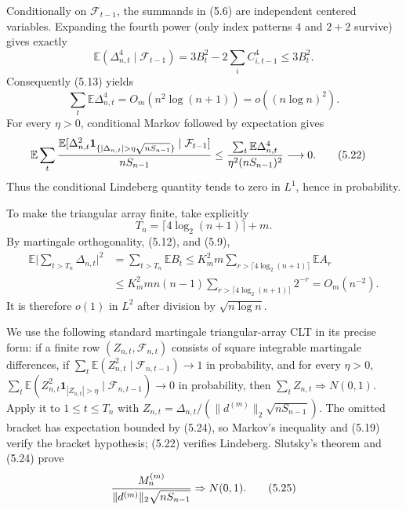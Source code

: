 \documentclass[11pt]{article}
\numberwithin{equation}{section}
\newcommand{\E}{\mathbb E}\newcommand{\Pp}{\mathbb P}
\newcommand{\1}{\mathbf 1}\newcommand{\F}{\mathcal F}\newcommand{\D}{\mathcal D}
\begin{document}
Conditionally on $\mathcal F_{t-1}$, the summands in (5.6) are independent
centered variables.  Expanding the fourth power (only index patterns $4$ and
$2+2$ survive) gives exactly
\begin{equation}
 \E(\Delta_{n,t}^4\mid\mathcal F_{t-1})
 =3B_t^2-2\sum_iC_{i,t-1}^4\le3B_t^2.                        \tag{5.20}
\end{equation}
Consequently (5.13) yields
\begin{equation}
 \sum_t\E\Delta_{n,t}^4=O_m(n^2\log(n+1))
                         =o((n\log n)^2).                    \tag{5.21}
\end{equation}
For every $\eta>0$, conditional Markov followed by expectation gives
\begin{align}
 \E\sum_t {\E[\Delta_{n,t}^2{\mathbf 1}_{\{|\Delta_{n,t}|>
 \eta\sqrt{nS_{n-1}}\}}\mid\mathcal F_{t-1}]\over nS_{n-1}}
 &\le {\sum_t\E\Delta_{n,t}^4\over
             \eta^2(nS_{n-1})^2}\longrightarrow0.           \tag{5.22}
\end{align}
Thus the conditional Lindeberg quantity tends to zero in $L^1$, hence in
probability.

To make the triangular array finite, take explicitly
\begin{equation}T_n=\lceil4\log_2(n+1)\rceil+m.               \tag{5.23}
\end{equation}
By martingale orthogonality, (5.12), and (5.9),
\begin{align}
 \E\Big|\sum_{t>T_n}\Delta_{n,t}\Big|^2
 &=\sum_{t>T_n}\E B_t
 \le K_m^2m\sum_{r>\lceil4\log_2(n+1)\rceil}\E A_r\\
 &\le K_m^2mn(n-1)\sum_{r>\lceil4\log_2(n+1)\rceil}2^{-r}
 =O_m(n^{-2}).                                                \tag{5.24}
\end{align}
It is therefore $o(1)$ in $L^2$ after division by $\sqrt{n\log n}$.

We use the following standard martingale triangular-array CLT in its precise
form: if a finite row $(Z_{n,t},\mathcal F_{n,t})$ consists of square
integrable martingale differences, if
$\sum_t\E(Z_{n,t}^2\mid\mathcal F_{n,t-1})\to1$ in probability, and for
every $\eta>0$,
$\sum_t\E(Z_{n,t}^2{\mathbf 1}_{|Z_{n,t}|>\eta}\mid
\mathcal F_{n,t-1})\to0$ in probability, then $\sum_tZ_{n,t}\Rightarrow
N(0,1)$.  Apply it to $1\le t\le T_n$ with
$Z_{n,t}=\Delta_{n,t}/(\|d^{(m)}\|_2\sqrt{nS_{n-1}})$.
The omitted bracket has expectation bounded by (5.24), so Markov's
inequality and (5.19) verify the bracket hypothesis; (5.22) verifies
Lindeberg.  Slutsky's theorem and (5.24) prove
\begin{equation}
 {M_n^{(m)}\over\|d^{(m)}\|_2\sqrt{nS_{n-1}}}
 \Rightarrow N(0,1).                                         \tag{5.25}
\end{equation}
\end{document}
